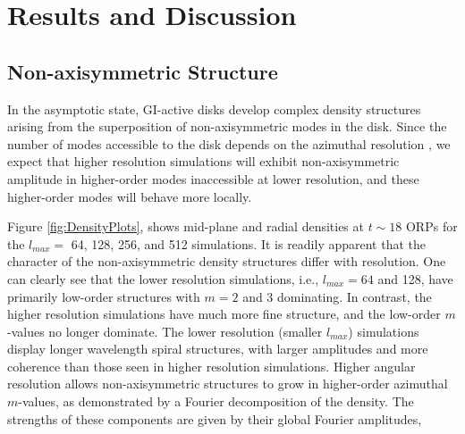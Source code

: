 \documentclass[manuscript]{aastex}
\begin{document}

\section{Results and Discussion}

\subsection{Non-axisymmetric Structure}
	
In the asymptotic state, GI-active disks develop complex density structures arising from the superposition of non-axisymmetric
modes in the disk.  Since the number of modes accessible to the disk depends on the azimuthal resolution \citep{shannon1984}, we expect that higher resolution simulations will exhibit non-axisymmetric amplitude in higher-order modes inaccessible at lower resolution, and these higher-order modes will 
behave more locally. 
	
Figure \ref{fig:DensityPlots}, shows mid-plane and radial densities  at $t \sim 18$ ORPs for the $l_{max} =$ 64, 128, 256, and 512 simulations. It is readily apparent that the character of the non-axisymmetric density structures differ with 
resolution. One can clearly see that the lower resolution simulations, i.e., $l_{max} = 64$ and 128, have primarily low-order structures with $m = 2$ and 3 dominating. In contrast, the higher resolution simulations have much more fine structure, 
and the low-order $m$-values no longer dominate.  
The lower resolution (smaller $l_{max}$) simulations display longer wavelength spiral structures, with larger amplitudes and more coherence than those seen in higher resolution simulations. Higher angular resolution allows non-axisymmetric structures to grow in higher-order azimuthal $m$-values, as demonstrated by a Fourier decomposition of the density. The strengths of these components are given by their global Fourier amplitudes,
\end{document}
